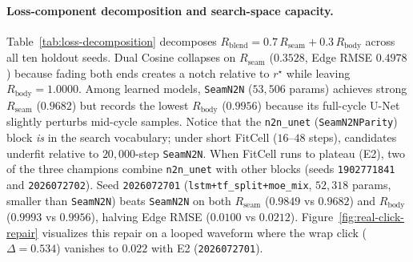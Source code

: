 \paragraph{Loss-component decomposition and search-space capacity.}
Table~\ref{tab:loss-decomposition} decomposes $R_{\mathrm{blend}}{=}0.7\,R_{\mathrm{seam}}{+}0.3\,R_{\mathrm{body}}$ across all ten holdout seeds.
Dual Cosine collapses on $R_{\mathrm{seam}}$ ($0.3528$, Edge RMSE $0.4978$) because fading both ends creates a notch relative to $r^{\star}$ while leaving $R_{\mathrm{body}}{=}1.0000$.
Among learned models, \texttt{SeamN2N} ($53{,}506$ params) achieves strong $R_{\mathrm{seam}}$ ($0.9682$) but records the lowest $R_{\mathrm{body}}$ ($0.9956$) because its full-cycle U-Net slightly perturbs mid-cycle samples.
Notice that the \texttt{n2n\_unet} (\texttt{SeamN2NParity}) block \emph{is} in the search vocabulary; under short FitCell ($16$--$48$ steps), candidates underfit relative to $20{,}000$-step \texttt{SeamN2N}.
When FitCell runs to plateau (E2), two of the three champions combine \texttt{n2n\_unet} with other blocks (seeds \texttt{1902771841} and \texttt{2026072702}). Seed \texttt{2026072701} (\texttt{lstm+tf\_split+moe\_mix}, $52{,}318$ params, smaller than \texttt{SeamN2N}) beats \texttt{SeamN2N} on both $R_{\mathrm{seam}}$ ($0.9849$ vs $0.9682$) and $R_{\mathrm{body}}$ ($0.9993$ vs $0.9956$), halving Edge RMSE ($0.0100$ vs $0.0212$).
Figure~\ref{fig:real-click-repair} visualizes this repair on a looped waveform where the wrap click ($\Delta{=}0.534$) vanishes to $0.022$ with E2 (\texttt{2026072701}).

